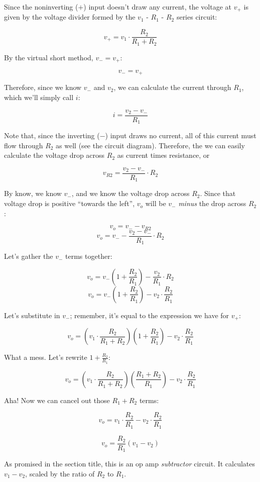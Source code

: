 \documentclass[12pt,a4paper]{report}
\begin{document}
Since the noninverting ($+$) input doesn't draw any current, the voltage at $v_+$ is given by the voltage divider formed by the $v_1$ - $R_1$ - $R_2$ series circuit:

\[ v_+ = v_1 \cdot \frac{R_2}{R_1 + R_2} \]

By the virtual short method, $v_- = v_+$:

\[ v_- = v_+ \]

Therefore, since we know $v_-$ and $v_2$, we can calculate the current through $R_1$, which we'll simply call $i$:

\[ i = \frac{v_2 - v_-}{R_1} \]

Note that, since the inverting ($-$) input draws no current, all of this current must flow through $R_2$ as well (see the circuit diagram). Therefore, the we can easily calculate the voltage drop across $R_2$ as current times resistance, or

\[ v_{R2} = \frac{v_2 - v_-}{R_1} \cdot R_2 \] 

By know, we know $v_-$, and we know the voltage drop across $R_2$. Since that voltage drop is positive ``towards the left'', $v_o$ will be $v_-$ \emph{minus} the drop across $R_2$:

\[ v_o = v_- - v_{R2} \]
\[ v_o = v_- - \frac{v_2 - v_-}{R_1} \cdot R_2 \]

Let's gather the $v_-$ terms together:

\[ v_o = v_-(1 + \frac{R_2}{R_1}) - \frac{v_2}{R_1} \cdot R_2 \]
\[ v_o = v_-(1 + \frac{R_2}{R_1}) - v_2 \cdot \frac{R_2}{R_1} \]

Let's substitute in $v_-$; remember, it's equal to the expression we have for $v_+$:

\[ v_o = (v_1 \cdot \frac{R_2}{R_1 + R_2}) (1 + \frac{R_2}{R_1}) - v_2 \cdot \frac{R_2}{R_1} \]

What a mess. Let's rewrite $\displaystyle 1 + \frac{R_2}{R_1}$:

\[ v_o = (v_1 \cdot \frac{R_2}{R_1 + R_2}) (\frac{R_1 + R_2}{R_1}) - v_2 \cdot \frac{R_2}{R_1} \]

Aha! Now we can cancel out those $R_1 + R_2$ terms:

\[ v_o = v_1 \cdot \frac{R_2}{R_1} - v_2 \cdot \frac{R_2}{R_1} \]

\[ v_o = \frac{R_2}{R_1} \left(v_1 - v_2 \right) \]

As promised in the section title, this is an op amp \emph{subtractor} circuit. It calculates $v_1 - v_2$, scaled by the ratio of $R_2$ to $R_1$.
\end{document}
